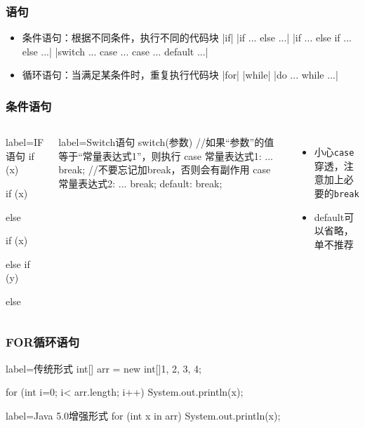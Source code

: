 \begin{frame}
  \frametitle{语句}
  \begin{itemize}
    \item 条件语句：根据不同条件，执行不同的代码块
      \java|if|
      \java|if ... else ...|
      \java|if ... else if ... else ...|
      \java|switch ... case ... case ... default ...|
    \item 循环语句：当满足某条件时，重复执行代码块
      \java |for|
      \java |while|
      \java |do ... while ...|
  \end{itemize}

\end{frame}

\begin{frame}[fragile]
  \frametitle{条件语句}
    \begin{columns}
        \begin{javacode*}{label=IF语句}
       if (x) {
       
       } 
       
       if (x) {
       
       } else {
       
       }
       
       if (x) {
       
       } else if (y) {
       
       } else {
       
       }
      \end{javacode*}
      \begin{javacode*}{label=Switch语句}
        switch(参数) {
          //如果“参数”的值等于“常量表达式1”，则执行
          case 常量表达式1: 
            ...
            break; 
            //不要忘记加break，否则会有副作用
          case 常量表达式2: 
            ...
            break;
          default: 
            break;
        }
      \end{javacode*}
      \begin{itemize}
        \item 小心\texttt{case}穿透，注意加上必要的\texttt{break}
        \item default可以省略，单不推荐
      \end{itemize}
    \end{columns}
\end{frame}


\begin{frame}[fragile]
  \frametitle{FOR循环语句}
  \begin{javacode*}{label=传统形式}
    int[] arr = new int[]{1, 2, 3, 4};
    
    for (int i=0; i< arr.length; i++) {
      System.out.println(x);
    }
  \end{javacode*}
  
  \begin{javacode*}{label=Java 5.0增强形式}
    for (int x in arr) {
      System.out.println(x);
    }
  \end{javacode*}
\end{frame}


